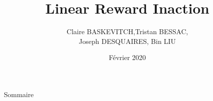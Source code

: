 \documentclass[c]{beamer}
\title{Linear Reward Inaction}
\author[C. BASKEVITCH, T. BESSAC, J. DESQUAIRES, B. LIU]{Claire BASKEVITCH,Tristan BESSAC,\\Joseph DESQUAIRES, Bin LIU}
\institute{Paris Saclay}
\date{Février 2020}
\begin{document}
\begin{frame}
\titlepage
\end{frame}
\begin{frame}{Sommaire}
\tableofcontents[pausesections]
\end{frame}






\end{document}
